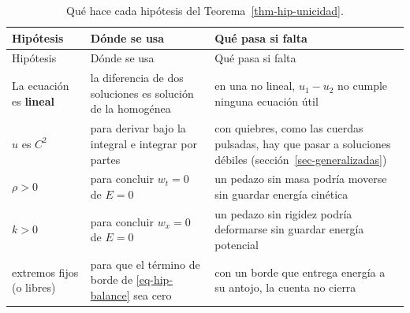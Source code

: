 \documentclass[
  spanish,
  a4paper,
]{scrbook}
\theoremstyle{definition}
\theoremstyle{plain}
\theoremstyle{definition}
\theoremstyle{plain}
\theoremstyle{definition}
\theoremstyle{remark}
\begin{document}
\begin{longtable}[]{@{}
  >{\raggedright\arraybackslash}p{}
  >{\raggedright\arraybackslash}p{}
  >{\raggedright\arraybackslash}p{}@{}}
\caption{Qué hace cada hipótesis del
Teorema~\ref{thm-hip-unicidad}.}\label{tbl-hip-unicidad}\tabularnewline
\toprule\noalign{}
\begin{minipage}[b]{\linewidth}\raggedright
Hipótesis
\end{minipage} & \begin{minipage}[b]{\linewidth}\raggedright
Dónde se usa
\end{minipage} & \begin{minipage}[b]{\linewidth}\raggedright
Qué pasa si falta
\end{minipage} \\
\midrule\noalign{}
\endfirsthead
\toprule\noalign{}
\begin{minipage}[b]{\linewidth}\raggedright
Hipótesis
\end{minipage} & \begin{minipage}[b]{\linewidth}\raggedright
Dónde se usa
\end{minipage} & \begin{minipage}[b]{\linewidth}\raggedright
Qué pasa si falta
\end{minipage} \\
\midrule\noalign{}
\endhead
\bottomrule\noalign{}
\endlastfoot
La ecuación es \textbf{lineal} & la diferencia de dos soluciones es
solución de la homogénea & en una no lineal, \(u_1-u_2\) no cumple
ninguna ecuación útil \\
\(u\) es \(C^2\) & para derivar bajo la integral e integrar por partes &
con quiebres, como las cuerdas pulsadas, hay que pasar a soluciones
débiles (sección~\ref{sec-generalizadas}) \\
\(\rho > 0\) & para concluir \(w_t = 0\) de \(E = 0\) & un pedazo sin
masa podría moverse sin guardar energía cinética \\
\(k > 0\) & para concluir \(w_x = 0\) de \(E = 0\) & un pedazo sin
rigidez podría deformarse sin guardar energía potencial \\
extremos fijos (o libres) & para que el término de borde de
\ref{eq-hip-balance} sea cero & con un borde que entrega energía a su
antojo, la cuenta no cierra \\
\end{longtable}
\end{document}
